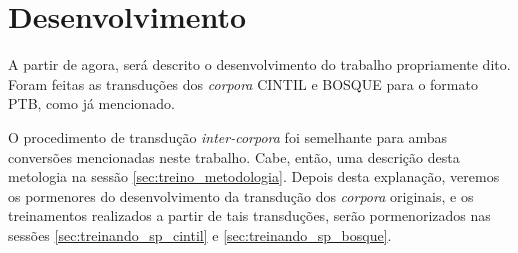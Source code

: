 \chapter{Desenvolvimento}
\label{cap:desenv}

A partir de agora, será descrito o desenvolvimento do trabalho propriamente dito. Foram feitas as transduções dos \textit{corpora} CINTIL e BOSQUE para o formato PTB, como já mencionado. 

O procedimento de transdução \textit{inter-corpora} foi semelhante para ambas conversões mencionadas neste trabalho. Cabe, então, uma descrição desta metologia na sessão \ref{sec:treino_metodologia}. Depois desta explanação, veremos os pormenores do desenvolvimento da transdução dos \textit{corpora} originais, e os treinamentos realizados a partir de tais transduções, serão pormenorizados nas sessões \ref{sec:treinando_sp_cintil} e \ref{sec:treinando_sp_bosque}.  






